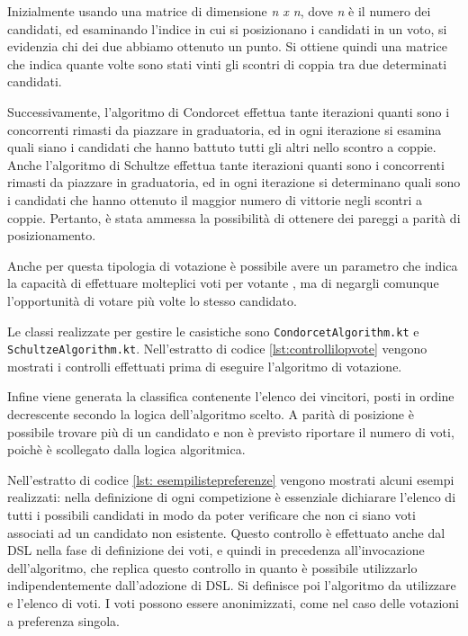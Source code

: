 \documentclass[12pt,a4paper,openright,twoside]{book}
\begin{document}
Inizialmente usando una matrice di dimensione \textit{n x n}, dove \textit{n} è il numero dei candidati, ed esaminando l'indice in cui si posizionano i 
candidati in un voto, si evidenzia chi dei due abbiamo ottenuto un punto. Si ottiene quindi una matrice che indica quante volte 
sono stati vinti gli scontri di coppia tra due determinati candidati.

Successivamente, l'algoritmo di Condorcet effettua tante iterazioni quanti sono i concorrenti rimasti da piazzare in graduatoria,
ed in ogni iterazione si esamina quali siano i candidati che hanno battuto tutti gli altri nello scontro a coppie.
Anche l'algoritmo di Schultze effettua tante iterazioni quanti sono i concorrenti rimasti da piazzare in graduatoria, ed in ogni iterazione
si determinano quali sono i candidati che hanno ottenuto il maggior numero di vittorie negli scontri a coppie.
Pertanto, è stata ammessa la possibilità di ottenere dei pareggi a parità di posizionamento.

Anche per questa tipologia di votazione è possibile avere un parametro che indica la capacità di effettuare molteplici voti per votante , ma di negargli
comunque l'opportunità di votare più volte lo stesso candidato.

Le classi realizzate per gestire le casistiche sono \texttt{CondorcetAlgorithm.kt} e \texttt{SchultzeAlgorithm.kt}.
Nell'estratto di codice \ref{lst:controllilopvote} vengono mostrati i controlli effettuati prima di 
eseguire l'algoritmo di votazione.




Infine viene generata la classifica contenente l'elenco dei vincitori, posti in ordine decrescente secondo la logica dell'algoritmo scelto.
A parità di posizione è possibile trovare
più di un candidato e non è previsto riportare il numero di voti, poichè è scollegato dalla logica algoritmica.

Nell'estratto di codice \ref{lst: esempilistepreferenze} vengono mostrati alcuni esempi realizzati: nella definizione di ogni competizione
è essenziale dichiarare l'elenco di tutti i possibili candidati in modo da poter verificare che non ci siano voti associati ad un candidato non esistente.
Questo controllo è effettuato anche dal DSL nella fase di definizione dei voti, e quindi in precedenza all'invocazione dell'algoritmo,
che replica questo controllo in quanto è possibile utilizzarlo indipendentemente dall'adozione di DSL.
Si definisce poi l'algoritmo da utilizzare e l'elenco di voti. 
I voti possono essere anonimizzati, come nel caso delle votazioni a preferenza singola.
\end{document}
